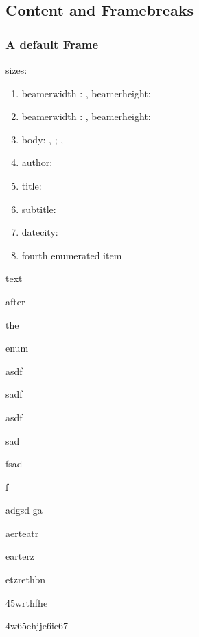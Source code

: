 \documentclass[german,aspectratio=169,notoc,titlestyle=tud,draft]{tudbeamer}%
\begin{document}
\subsection*{Content and Framebreaks}
\begin{frame}[allowframebreaks]
	\frametitle{A default Frame}
	sizes:
	\begin{enumerate}
		\item beamerwidth : \the\paperwidth, beamerheight: \the\paperheight
		\item beamerwidth : \number\paperwidth, beamerheight:\number\paperheight
		\item body: \the\bodyx, \the\bodyy; \the\bodywidth, \the\bodywidth
		\item author: \insertauthor
		\item title: \inserttitle
		\item subtitle: \insertsubtitle
		\item datecity: \insertdatecity
		\item fourth enumerated item
	\end{enumerate}
	text 

	after 

	the 

	enum

	asdf

	sadf
	
	asdf
	
	sad
	
	fsad
	
	f

	adgsd
	ga

	aerteatr

	earterz

	etzrethbn

	45wrthfhe

	4w65ehjje6ie67
\end{frame}
\end{document}
